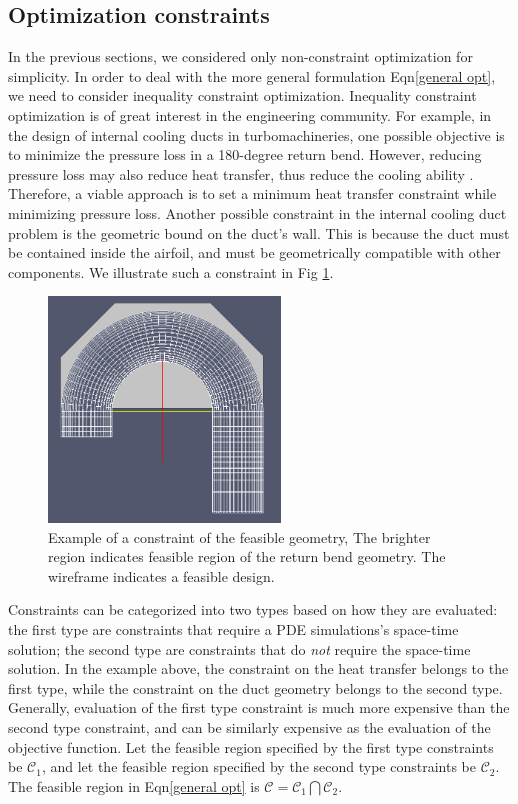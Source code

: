 \documentclass[a4paper,onecolumn]{article}
\theoremstyle{remark}
\begin{document}
\subsection{Optimization constraints}
\label{constraints}
\noindent In the previous sections, we considered only non-constraint optimization for simplicity.
In order to deal with the more general formulation Eqn\eqref{general opt}, we
need to consider inequality constraint optimization. Inequality constraint optimization 
is of great interest in the engineering community. For example, in the design of
internal cooling ducts in turbomachineries, one possible objective is to minimize 
the pressure loss in a 180-degree return bend. However, reducing pressure loss may 
also reduce heat transfer, thus reduce the cooling ability
\cite{ubend rans opt 1, ubend rans opt 2}. Therefore, a viable approach is to set
a minimum heat transfer constraint while minimizing pressure loss. Another possible constraint
in the internal cooling duct problem is the geometric bound on the duct's wall.
This is because the duct must be contained 
inside the airfoil, and must be geometrically compatible with other components.
We illustrate such a constraint in Fig \ref{fig: simple constraint}.
\begin{figure}[H]
    \begin{center}
        \includegraphics[height=6cm]{geometric_constraint.png}
        \caption{Example of a constraint of the feasible geometry, The brighter region indicates
                 feasible region of the return bend geometry. The wireframe indicates
                 a feasible design.}
        \label{fig: simple constraint}
    \end{center}
\end{figure}

\noindent Constraints can be categorized into two types based on how they are evaluated: 
the first type are constraints that require a PDE simulations's space-time solution;
the second type are constraints that do \emph{not} require the space-time solution.
In the example above, the constraint on the heat transfer belongs to the first type,
while the constraint on the duct geometry belongs to the second type.
Generally, evaluation of the first type constraint is much more expensive than
the second type constraint, and can be similarly expensive as the evaluation of the 
objective function.
Let the feasible region specified by the first type constraints be $\mathcal{C}_1$,
and let the feasible region specified by the second type constraints be $\mathcal{C}_2$.
The feasible region in Eqn\eqref{general opt} is $\mathcal{C} = \mathcal{C}_1 \bigcap
\mathcal{C}_2$.
\\
\end{document}
